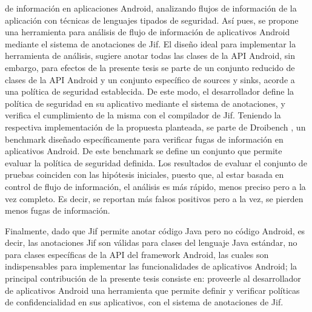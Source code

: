 de información en aplicaciones Android, analizando flujos de información de la
aplicación con técnicas de lenguajes tipados de seguridad.\newline 
Así pues, se propone una herramienta para análisis de flujo de información de
aplicativos Android mediante el sistema de anotaciones de Jif.\newline 
El diseño ideal para implementar la herramienta de análisis, sugiere anotar
todas las clases de la API Android, sin embargo, para efectos de la presente
tesis se parte de un conjunto reducido de clases de la API Android y un conjunto
específico de sources y sinks, acorde a una política de seguridad establecida. 
De este modo, el desarrollador define la política de seguridad en su aplicativo
mediante el sistema de anotaciones, y verifica el cumplimiento de la misma con
el compilador de Jif.\newline 
Teniendo la respectiva implementación de la propuesta planteada, se parte de
Droibench \cite{DroidBenchBenchmarks}, un benchmark diseñado específicamente
para verificar fugas de información en aplicativos Android. De este benchmark se
define un conjunto que permite evaluar la política de seguridad definida.\newline
Los resultados de evaluar el conjunto de pruebas coinciden con las hipótesis
iniciales, puesto que, al estar basada en control de flujo de información, el análisis es más rápido,
menos preciso pero a la vez completo. Es decir, se reportan más falsos positivos
pero a la vez, se pierden menos fugas de información.

Finalmente, dado que Jif permite
anotar código Java pero no código Android, es decir, las anotaciones Jif son
válidas para clases del lenguaje Java estándar, no para clases específicas de la
API del framework Android, las cuales son indispensables para
implementar las funcionalidades de aplicativos Android; la principal
contribución de la presente tesis consiste en: proveerle al desarrollador de
aplicativos Android una herramienta que permite definir y verificar políticas de
confidencialidad en sus aplicativos, con el sistema de anotaciones de
Jif.\newline


